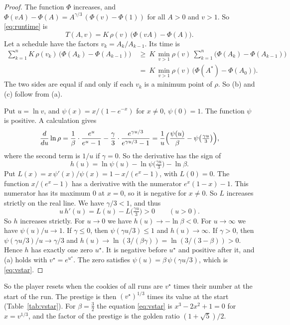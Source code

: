 \documentclass[11pt]{article}
\theoremstyle{boxed}
\begin{document}
\begin{proof}
 The function $\Phi$ increases, and $\Phi(vA)-\Phi(A)=A^{\gamma/3}\,(\Phi(v)-\Phi(1))$
for all $A>0$ and $v>1$. So \eqref{eq:runtime} is
\[
  T(A,v)=K\,\rho(v)\,\bigl(\Phi(vA)-\Phi(A)\bigr).
\]
Let a schedule have the factors $v_k=A_k/A_{k-1}$. Its time is
\begin{align*}
  \sum_{k=1}^{n}K\,\rho(v_k)\,\bigl(\Phi(A_k)-\Phi(A_{k-1})\bigr)
  &\ \ge\ K\,\min_{v>1}\rho(v)\ \sum_{k=1}^{n}\bigl(\Phi(A_k)-\Phi(A_{k-1})\bigr)\\
  &\ =\ K\,\min_{v>1}\rho(v)\,\bigl(\Phi(A^{\ast})-\Phi(A_0)\bigr).
\end{align*}
The two sides are equal if and only if each $v_k$ is a minimum point of $\rho$. So (b) and (c)
follow from (a).

 Put $u=\ln v$, and $\psi(x)=x/(1-e^{-x})$ for $x\ne0$, $\psi(0)=1$. The
function $\psi$ is positive. A calculation gives
\[
  \frac{d}{du}\ln\rho=\frac1\beta\cdot\frac{e^{u}}{e^{u}-1}
  -\frac\gamma3\cdot\frac{e^{\gamma u/3}}{e^{\gamma u/3}-1}
  =\frac1u\Bigl(\frac{\psi(u)}{\beta}-\psi\bigl(\tfrac{\gamma u}{3}\bigr)\Bigr),
\]
where the second term is $1/u$ if $\gamma=0$. So the derivative has the sign of
\[
  h(u)=\ln\psi(u)-\ln\psi\bigl(\tfrac{\gamma u}{3}\bigr)-\ln\beta .
\]
Put $L(x)=x\,\psi'(x)/\psi(x)=1-x/(e^{x}-1)$, with $L(0)=0$. The function $x/(e^{x}-1)$ has a
derivative with the numerator $e^{x}(1-x)-1$. This numerator has its maximum $0$ at $x=0$, so
it is negative for $x\ne0$. So $L$ increases strictly on the real line. We have $\gamma/3<1$, and thus
\[
  u\,h'(u)=L(u)-L\bigl(\tfrac{\gamma u}{3}\bigr)>0\qquad(u>0).
\]
So $h$ increases strictly. For $u\to0$ we have $h(u)\to-\ln\beta<0$. For $u\to\infty$ we have
$\psi(u)/u\to1$. If $\gamma\le0$, then $\psi(\gamma u/3)\le1$ and $h(u)\to\infty$. If $\gamma>0$,
then $\psi(\gamma u/3)/u\to\gamma/3$ and $h(u)\to\ln(3/(\beta\gamma))=\ln(3/(3-\beta))>0$. Hence
$h$ has exactly one zero $u^{\star}$. It is negative before $u^{\star}$ and positive after it,
and (a) holds with $v^{\star}=e^{u^{\star}}$. The zero satisfies
$\psi(u)=\beta\,\psi(\gamma u/3)$, which is \eqref{eq:vstar}.
\end{proof}

So the player resets when the cookies of all runs are $v^{\star}$ times their number at the
start of the run. The prestige is then $(v^{\star})^{1/3}$ times its value at the start
(Table~\ref{tab:vstar}). For $\beta=\frac32$ the equation \eqref{eq:vstar} is
$x^{3}-2x^{2}+1=0$ for $x=v^{1/3}$, and the factor of the prestige is the golden ratio
$(1+\sqrt5)/2$.
\end{document}
